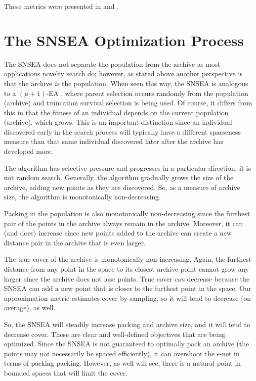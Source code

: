 \documentclass[twoside]{article}
\begin{document}
These metrics were presented in \citet{Wiegand2020flairs} and \citet{Wiegand2021flairs}.



\section{The SNSEA Optimization Process}
\label{sec:resultssnsea}

The SNSEA does not separate the population from the archive as most applications novelty search do; however, as stated above another perspective is that the archive \emph{is} the population.  When seen this way, the SNSEA is analogous to a $(\mu+1)$-EA \citep{ec:DeJong2006}, where parent selection occurs randomly from the population (archive) and truncation survival selection is being used.  Of course, it differs from this in that the fitness of an individual depends on the current population (archive), which grows.  This is an important distinction since an individual discovered early in the search process will typically have a different sparseness measure than that same individual discovered later after the archive has developed more.

The algorithm has selective pressure and progresses in a particular direction; it is not random search.  Generally, the algorithm gradually grows the size of the archive, adding new points as they are discovered.  So, as a measure of archive size, the algorithm is monotonically non-decreasing.

Packing in the population is also monotonically non-decreasing since the furthest pair of the points in the archive always remain in the archive.  Moreover, it can (and does) increase since new points added to the archive can create a new distance pair in the archive that is even larger.

The true cover of the archive is monotonically non-increasing.  Again, the furthest distance from any point in the space to its closest archive point cannot grow any larger since the archive does not lose points.  True cover \emph{can} decrease because the SNSEA can add a new point that is closer to the furthest point in the space.  Our approximation metric estimates cover by sampling, so it will tend to decrease (on average), as well.  

So, the SNSEA will steadily increase packing and archive size, and it will tend to decrease cover.  These are clear and well-defined objectives that are being optimized.  Since the SNSEA is not guaranteed to optimally pack an archive (the points may not necessarily be spaced efficiently), it can overshoot the $\epsilon$-net in terms of packing packing.  However, as well will see, there is a natural point in bounded spaces that will limit the cover.
\end{document}
